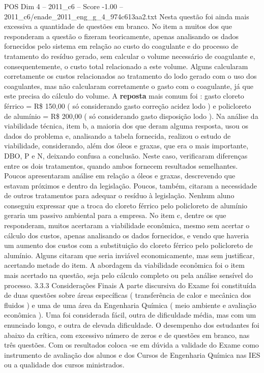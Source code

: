 \begin{textsample}{POS Dim 4 – 2011\_c6 – Score -1.00 – 2011\_c6/enade\_2011\_eng\_g\_4\_974c613aa2.txt}
Nesta questão foi ainda mais excessiva a quantidade de questões em branco.
No item a muitos dos que responderam a questão o fizeram teoricamente, apenas analisando os dados fornecidos pelo sistema em relação ao custo do coagulante e do processo de tratamento do resíduo gerado, sem calcular o volume necessário de coagulante e, consequentemente, o custo total relacionado a este volume.
Alguns calcularam corretamente os custos relacionados ao tratamento do lodo gerado com o uso dos coagulantes, mas não calcularam corretamente o gasto com o coagulante, já que este precisa do cálculo do volume.
A \textbf{reposta} mais comum foi : gasto cloreto férrico = R\$ 150,00 ( só considerando gasto correção acidez lodo ) e policloreto de alumínio = R\$ 200,00 ( só considerando gasto disposição lodo ).
Na análise da viabilidade técnica, item b, a maioria dos que deram alguma resposta, usou os dados do problema e, analisando a tabela fornecida, realizou o estudo de viabilidade, considerando, além dos óleos e graxas, que era o mais importante, DBO, P e N, deixando confusa a conclusão.
Neste caso, verificaram diferenças entre os dois tratamentos, quando ambos fornecem resultados semelhantes.
Poucos apresentaram análise em relação a óleos e graxas, descrevendo que estavam próximos e dentro da legislação.
Poucos, também, citaram a necessidade de outros tratamentos para adequar o resíduo à legislação.
Nenhum aluno conseguiu expressar que a troca do cloreto férrico pelo policloreto de alumínio geraria um passivo ambiental para a empresa.
No item c, dentre os que responderam, muitos acertaram a viabilidade econômica, mesmo sem acertar o cálculo dos custos, apenas analisando os dados fornecidos, e vendo que haveria um aumento dos custos com a substituição do cloreto férrico pelo policloreto de alumínio.
Alguns citaram que seria inviável economicamente, mas sem justificar, acertando metade do item.
A abordagem da viabilidade econômica foi o item mais acertado na questão, seja pelo cálculo completo ou pela análise sensível do processo. 3.3.3 Considerações Finais A parte discursiva do Exame foi constituída de duas questões sobre áreas específicas ( transferência de calor e mecânica dos fluidos ) e uma de uma área da Engenharia Química ( meio ambiente e avaliação econômica ).
Uma foi considerada fácil, outra de dificuldade média, mas com um enunciado longo, e outra de elevada dificuldade.
O desempenho dos estudantes foi abaixo da crítica, com excessivo número de zeros e de questões em branco, nas três questões.
Com os resultados coloca -se em dúvida a validade do Exame como instrumento de avaliação dos alunos e dos Cursos de Engenharia Química nas IES ou a qualidade dos cursos ministrados.

\end{textsample}
